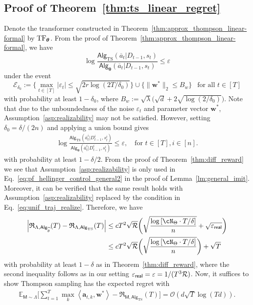 \documentclass[10pt]{article}
\renewcommand{\epsilon}{\varepsilon}
\newcommand{\eps}{\varepsilon}
\renewcommand{\cO}{\mathcal{O}}
\newcommand{\<}{\left\langle}
\renewcommand{\>}{\right\rangle}
\newcommand{\TF}{{\rm TF}}
\newcommand{\brac}[1]{{\left[ #1 \right]}}
\newcommand{\E}{\mathbb{E}}
\newcommand{\inst}{{\mathsf{M}}}
\newcommand{\TS}{{\mathrm{TS}}}
\newcommand{\Tpsparn}{{r}}
\newcommand{\hpevent}{{\mathcal E}}
\newcommand{\widebar}[1]{\overline{#1}}
\newcommand{\state}{{s}}
\newcommand{\eaction}{{\widebar{a}}}
\newcommand{\totlen}{{T}}
\newcommand{\sAlg}{{\mathsf{Alg}}}
\newcommand{\dset}{{D}}
\newcommand{\Parspace}{{\Theta}}
\newcommand{\EstPar}{{\widehat{\theta}}}
\newcommand{\prior}{{\Lambda}}
\newcommand{\geneps}{{\epsilon}_{\sf real}}
\newcommand{\tfpar}{{\btheta}}
\newcommand{\totreward}{{\mathfrak{R}}}
\newcommand{\distratio}{{\mathcal{R}}}
\def\btheta{{\boldsymbol \theta}}
\def\ba{{\mathbf a}}
\def\bw{{\mathbf w}}
\begin{document}
\subsection{Proof of Theorem~\ref{thm:ts_linear_regret}}\label{sec:pf_prop:ts_linear_regret}
Denote the transformer constructed in Theorem~\ref{thm:approx_thompson_linear-formal} by $\TF_\tfpar$.
From the proof of Theorem~\ref{thm:approx_thompson_linear-formal}, we have
$$\log\frac{\sAlg_{\TS}(\eaction_t|\dset_{t-1},\state_t)}{\sAlg_{\tfpar}(\eaction_t|\dset_{t-1},\state_t)}\leq \eps$$ under the event $$\hpevent_{\delta_0}:=\{\max_{t\in[T]}|\eps_t|\leq\sqrt{2\Tpsparn\log(2T/\delta_0)}\}\cup \{\|\bw^*\|_2\leq  B_w\}~~\text{ for all } t\in[\totlen]$$ with probability at least $1-\delta_0$, where  $B_w:=\sqrt{\lambda}\big(\sqrt{d}+2\sqrt{\log(2/\delta_0)}\big)$. Note that due to the unboundedness of the noise $\eps_t$ and parameter vector $\bw^*$, Assumption~\ref{asp:realizability} may not be satisfied. However, setting $\delta_0=\delta/(2n)$ and applying a union bound gives
\begin{align}
    \log\frac{\sAlg_{\TS}(\eaction^i_t|\dset^i_{t-1},\state^i_t)}{\sAlg_{\tfpar}(\eaction^i_t|\dset^i_{t-1},\state^i_t)}\leq \eps,~~~\text{ for } t\in[\totlen],i\in[n].\label{eq:unif_traj_realize}
\end{align}
with probability at least $1-\delta/2$.
From the proof of Theorem~\ref{thm:diff_reward} we see that Assumption~\ref{asp:realizability} is only used in Eq.~\eqref{eq:pf_hellinger_control_general2} in the proof of Lemma~\ref{lm:general_imit}. Moreover, it can be verified that the same result holds with  Assumption~\ref{asp:realizability}  replaced by the condition in Eq.~\eqref{eq:unif_traj_realize}. Therefore, we have \begin{align*}
\Big|\totreward_{\prior,\sAlg_\EstPar}(\totlen)-\totreward_{\prior,\sAlg_\TS}(\totlen)\Big|
&\leq
c \totlen^2 \sqrt{\distratio} \bigg(\sqrt{\frac{\log \brac{ \cN_{\Parspace} \cdot
 \totlen/\delta } }{n}} +  \sqrt{\geneps}\bigg)\\
 &\leq
 c \totlen^2 \sqrt{\distratio} \bigg(\sqrt{\frac{\log \brac{ \cN_{\Parspace} \cdot
 \totlen/\delta } }{n}}  \bigg)+\sqrt{\totlen}
\end{align*}
with probability at least $1-\delta$ as in Theorem~\ref{thm:diff_reward}, where the second inequality follows as in our setting $\geneps=\eps=1/(\totlen^3\distratio)$.
Now, it suffices to show Thompson sampling has the expected regret with
\begin{align*}
    \E_{\inst\sim\prior}\Big[\sum_{t=1}^\totlen\max_{k}\<\ba_{t,k},\bw^*\>-\totreward_{\inst,\sAlg_\TS}(\totlen)\Big]=\cO(d\sqrt{T}\log(Td)).
\end{align*}
\end{document}
